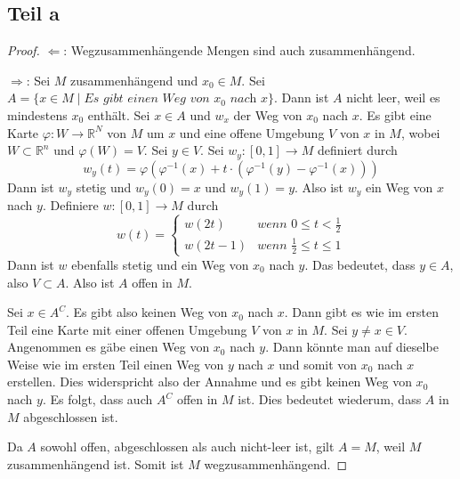 \documentclass[10pt,a4paper]{article}
\begin{document}
\subsection{Teil a}
\begin{proof}
  $\Leftarrow$: Wegzusammenhängende Mengen sind auch zusammenhängend.

  $\Rightarrow$: Sei $M$ zusammenhängend und $x_{0} \in M$.
  Sei $A = \{ x \in M \mid \textit{Es gibt einen Weg von $x_0$ nach $x$} \}$.
  Dann ist $A$ nicht leer, weil es mindestens $x_{0}$ enthält.
  Sei $x \in A$ und $w_{x}$ der Weg von $x_{0}$ nach $x$.
  Es gibt eine Karte $\varphi : W \rightarrow \mathbb{R}^{N}$ von $M$ um $x$ und eine offene Umgebung $V$ von $x$ in $M$, wobei $W \subset \mathbb{R}^{n}$ und $\varphi(W) = V$.
  Sei $y \in V$.
  Sei $w_{y} : [0, 1] \rightarrow M$ definiert durch
  \begin{equation}
    w_{y}(t) = \varphi(\varphi^{-1}(x) + t \cdot (\varphi^{-1}(y) - \varphi^{-1}(x)))
  \end{equation}
  Dann ist $w_{y}$ stetig und $w_{y}(0) = x$ und $w_{y}(1) = y$.
  Also ist $w_{y}$ ein Weg von $x$ nach $y$.
  Definiere $w : [0, 1] \rightarrow M$ durch
  \begin{equation}
    w(t) = \begin{cases}
      w(2t) & \textit{wenn $0 \le t < \frac{1}{2}$}\\
      w(2t - 1) & \textit{wenn $\frac{1}{2} \le t \le 1$}
    \end{cases}
  \end{equation}
  Dann ist $w$ ebenfalls stetig und ein Weg von $x_{0}$ nach $y$.
  Das bedeutet, dass $y \in A$, also $V \subset A$.
  Also ist $A$ offen in $M$.

  Sei $x \in A^{C}$.
  Es gibt also keinen Weg von $x_{0}$ nach $x$.
  Dann gibt es wie im ersten Teil eine Karte mit einer offenen Umgebung $V$ von $x$ in $M$.
  Sei $y \ne x \in V$.
  Angenommen es gäbe einen Weg von $x_{0}$ nach $y$.
  Dann könnte man auf dieselbe Weise wie im ersten Teil einen Weg von $y$ nach $x$ und somit von $x_{0}$ nach $x$ erstellen.
  Dies widerspricht also der Annahme und es gibt keinen Weg von $x_{0}$ nach $y$.
  Es folgt, dass auch $A^{C}$ offen in $M$ ist.
  Dies bedeutet wiederum, dass $A$ in $M$ abgeschlossen ist.

  Da $A$ sowohl offen, abgeschlossen als auch nicht-leer ist, gilt $A = M$, weil $M$ zusammenhängend ist.
  Somit ist $M$ wegzusammenhängend.
\end{proof}
\end{document}
